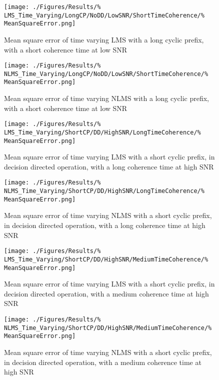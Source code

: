 \begin{figure}[ht]
	\centering
	\begin{minipage}{0.49\textwidth}
		\centering
		\texttt{[image: ./Figures/Results/\%
	LMS\_Time\_Varying/LongCP/NoDD/LowSNR/ShortTimeCoherence/\%
	MeanSquareError.png]}
		\captionsetup{width=0.75\linewidth}
		\caption{Mean square error of time varying LMS with a 
		long cyclic prefix, with a short coherence time at 
		low SNR}
	\end{minipage}
	\begin{minipage}{0.49\textwidth}
		\centering
		\texttt{[image: ./Figures/Results/\%
	NLMS\_Time\_Varying/LongCP/NoDD/LowSNR/ShortTimeCoherence/\%
	MeanSquareError.png]}
		\captionsetup{width=0.75\linewidth}
		\caption{Mean square error of time varying NLMS with 
		a long cyclic prefix, with a short coherence time at 
		low SNR}
	\end{minipage}
\end{figure}

\begin{figure}[ht]
	\centering
	\begin{minipage}{0.49\textwidth}
		\centering
		\texttt{[image: ./Figures/Results/\%
	LMS\_Time\_Varying/ShortCP/DD/HighSNR/LongTimeCoherence/\%
	MeanSquareError.png]}
		\captionsetup{width=0.75\linewidth}
		\caption{Mean square error of time varying LMS with a 
		short cyclic prefix, in decision directed operation, 
		with a long coherence time at high SNR}
	\end{minipage}
	\begin{minipage}{0.49\textwidth}
		\centering
		\texttt{[image: ./Figures/Results/\%
	NLMS\_Time\_Varying/ShortCP/DD/HighSNR/LongTimeCoherence/\%
	MeanSquareError.png]}
		\captionsetup{width=0.75\linewidth}
		\caption{Mean square error of time varying NLMS with 
		a short cyclic prefix, in decision directed 
		operation, with a long coherence time at high SNR}
	\end{minipage}
\end{figure}

\begin{figure}[ht]
	\centering
	\begin{minipage}{0.49\textwidth}
		\centering
		\texttt{[image: ./Figures/Results/\%
	LMS\_Time\_Varying/ShortCP/DD/HighSNR/MediumTimeCoherence/\%
	MeanSquareError.png]}
		\captionsetup{width=0.75\linewidth}
		\caption{Mean square error of time varying LMS with a 
		short cyclic prefix, in decision directed operation, 
		with a medium coherence time at high SNR}
	\end{minipage}
	\begin{minipage}{0.49\textwidth}
		\centering
		\texttt{[image: ./Figures/Results/\%
	NLMS\_Time\_Varying/ShortCP/DD/HighSNR/MediumTimeCoherence/\%
	MeanSquareError.png]}
		\captionsetup{width=0.75\linewidth}
		\caption{Mean square error of time varying NLMS with 
		a short cyclic prefix, in decision directed 
		operation, with a medium coherence time at high SNR}
	\end{minipage}
\end{figure}

